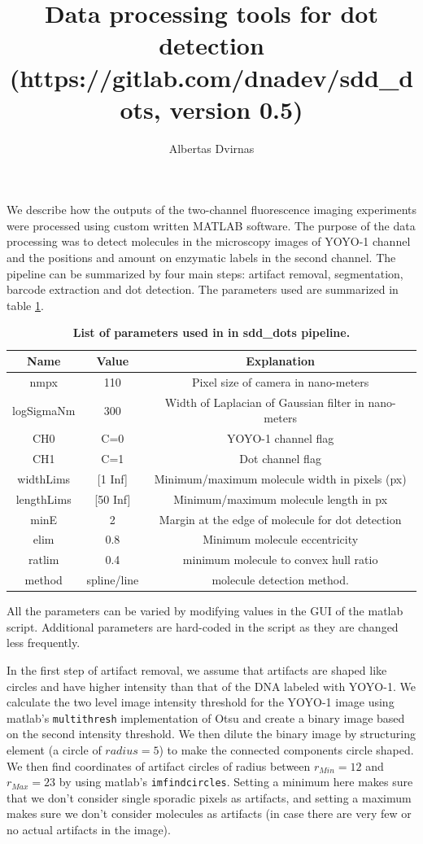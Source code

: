 \documentclass{article}
\title{Data processing tools for dot detection (https://gitlab.com/dnadev/sdd\_dots, version 0.5)}
\author{Albertas Dvirnas}
\begin{document}
%
\maketitle
%

We describe how the outputs of the two-channel fluorescence imaging experiments were processed using custom written MATLAB software. The purpose of the data processing was to detect molecules in the microscopy images of YOYO-1 channel and the positions and amount on enzymatic labels in the second channel. The pipeline can be summarized by four main steps: artifact removal, segmentation, barcode extraction and dot detection. The parameters used are summarized in table \ref{table:1}.

\begin{table}[h!]
	\centering
	\caption{{\bf List of parameters used in in sdd\_dots pipeline.}}
	\begin{tabular}{|c|c|c|}
		\hline
		Name & Value & Explanation \\
		\hline
		nmpx & 110 & Pixel size of camera in nano-meters\\
		logSigmaNm & 300 & Width of Laplacian of Gaussian filter in nano-meters\\
	  CH0 & C=0 & 	YOYO-1 channel flag\\
	  CH1 & C=1 & 	Dot channel flag\\
		widthLims & [1 Inf] & Minimum/maximum molecule width in pixels (px)\\
		lengthLims & [50 Inf] & Minimum/maximum molecule length in px\\
		minE & 2 & Margin at the edge of molecule for dot detection\\
	elim & 0.8 & Minimum molecule eccentricity\\
		ratlim & 0.4 & minimum molecule to convex hull ratio\\
		method &spline/line & molecule detection method.\\
		\hline
	\end{tabular}
	\begin{flushleft}
		All the parameters can be varied by modifying values in the GUI of the matlab script. Additional parameters are hard-coded in the script as they are changed less frequently.
	\end{flushleft}
	\label{table:1}
\end{table} 

In the first step of artifact removal, we assume that artifacts are shaped like circles and have higher intensity than that of the DNA labeled with YOYO-1. We calculate the two level image intensity threshold for the YOYO-1 image using matlab's \texttt{multithresh} implementation of Otsu and create a binary image based on the second intensity threshold. We then dilute the binary image by structuring element (a circle of $radius=5$) to make the connected components circle shaped. We then find coordinates of artifact circles of radius between $r_{Min}=12$ and $r_{Max}=23$ by using matlab's \texttt{imfindcircles}. Setting a minimum here makes sure that we don't consider single sporadic pixels as artifacts, and setting a maximum makes sure we don't consider molecules as artifacts (in case there are very few or no actual artifacts in the image).
\end{document}
